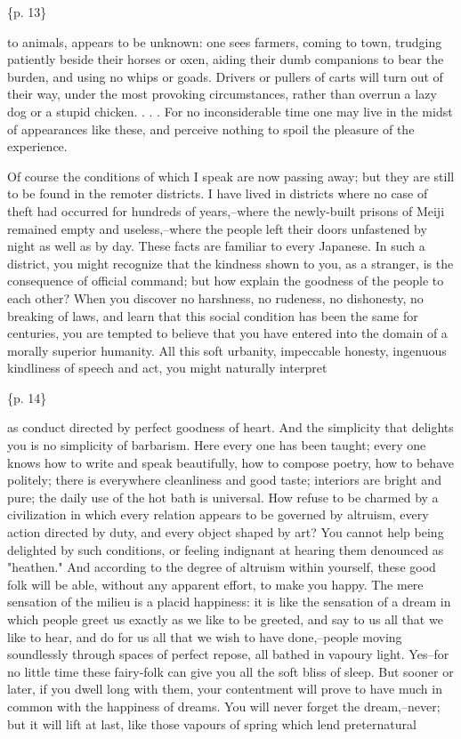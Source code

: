 \{p. 13\}

to animals, appears to be unknown: one sees farmers, coming to town, trudging patiently beside their horses or oxen, aiding their dumb companions to bear the burden, and using no whips or goads. Drivers or pullers of carts will turn out of their way, under the most provoking circumstances, rather than overrun a lazy dog or a stupid chicken. . . . For no inconsiderable time one may live in the midst of appearances like these, and perceive nothing to spoil the pleasure of the experience.

Of course the conditions of which I speak are now passing away; but they are still to be found in the remoter districts. I have lived in districts where no case of theft had occurred for hundreds of years,--where the newly-built prisons of Meiji remained empty and useless,--where the people left their doors unfastened by night as well as by day. These facts are familiar to every Japanese. In such a district, you might recognize that the kindness shown to you, as a stranger, is the consequence of official command; but how explain the goodness of the people to each other? When you discover no harshness, no rudeness, no dishonesty, no breaking of laws, and learn that this social condition has been the same for centuries, you are tempted to believe that you have entered into the domain of a morally superior humanity. All this soft urbanity, impeccable honesty, ingenuous kindliness of speech and act, you might naturally interpret

\{p. 14\}

as conduct directed by perfect goodness of heart. And the simplicity that delights you is no simplicity of barbarism. Here every one has been taught; every one knows how to write and speak beautifully, how to compose poetry, how to behave politely; there is everywhere cleanliness and good taste; interiors are bright and pure; the daily use of the hot bath is universal. How refuse to be charmed by a civilization in which every relation appears to be governed by altruism, every action directed by duty, and every object shaped by art? You cannot help being delighted by such conditions, or feeling indignant at hearing them denounced as "heathen." And according to the degree of altruism within yourself, these good folk will be able, without any apparent effort, to make you happy. The mere sensation of the milieu is a placid happiness: it is like the sensation of a dream in which people greet us exactly as we like to be greeted, and say to us all that we like to hear, and do for us all that we wish to have done,--people moving soundlessly through spaces of perfect repose, all bathed in vapoury light. Yes--for no little time these fairy-folk can give you all the soft bliss of sleep. But sooner or later, if you dwell long with them, your contentment will prove to have much in common with the happiness of dreams. You will never forget the dream,--never; but it will lift at last, like those vapours of spring which lend preternatural

